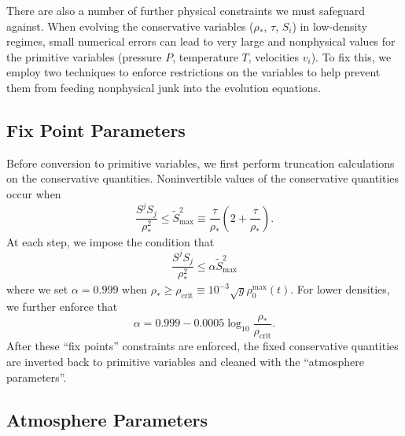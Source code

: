 There are also a number of further physical constraints we must safeguard against.
When evolving the conservative variables ($\rho_*$, $\tau$, $S_i$) in low-density regimes, small numerical errors can lead to very large and nonphysical values for the primitive variables (pressure $P$, temperature $T$, velocities $v_i$).
To fix this, we employ two techniques to enforce restrictions on the variables to help prevent them from feeding nonphysical junk into the evolution equations.

\subsection*{Fix Point Parameters}

Before conversion to primitive variables, we first perform truncation calculations on the conservative quantities.  Noninvertible values of the conservative quantities occur when
\begin{equation}
\frac{S^j S_j}{\rho_*^2} \le \tilde{S}_\textrm{max}^2 \equiv \frac{\tau}{\rho_*}\left(2+\frac{\tau}{\rho_*}\right).
\end{equation}
At each step, we impose the condition that
\begin{equation}
\frac{S^j S_j}{\rho_*^2} \le \alpha \tilde{S}_\textrm{max}^2
\end{equation}
where we set $\alpha = 0.999$ when $\rho_* \ge \rho_\textrm{crit} \equiv  10^{-3} \sqrt{g} \rho_0^\textrm{max}(t)$.  For lower densities, we further enforce that 
\begin{equation}
\alpha = 0.999 - 0.0005 \log_{10}{\frac{\rho_*}{\rho_\textrm{crit}}}.
\end{equation}
After these ``fix points'' constraints are enforced, the fixed conservative quantities are inverted back to primitive variables and cleaned with the ``atmosphere parameters''.

\subsection*{Atmosphere Parameters}

